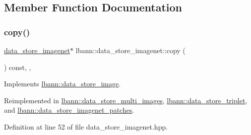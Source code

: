 \subsection{Member Function Documentation}
\mbox{\label{classlbann_1_1data__store__imagenet_ae3b0d31ac020c36f41766999288e2d25}} 
\subsubsection{\texorpdfstring{copy()}{copy()}}
{\footnotesize\ttfamily \hyperlink{classlbann_1_1data__store__imagenet}{data\+\_\+store\+\_\+imagenet}$\ast$ lbann\+::data\+\_\+store\+\_\+imagenet\+::copy (\begin{DoxyParamCaption}{ }\end{DoxyParamCaption}) const\hspace{0.3cm}{\ttfamily [inline]}, {\ttfamily [override]}, {\ttfamily [virtual]}}



Implements \hyperlink{classlbann_1_1data__store__image_ab62efcb2dbe3118bf2815fa5d51fee61}{lbann\+::data\+\_\+store\+\_\+image}.



Reimplemented in \hyperlink{classlbann_1_1data__store__multi__images_a1046efda9448bab9b42e9fcdf71e03f1}{lbann\+::data\+\_\+store\+\_\+multi\+\_\+images}, \hyperlink{classlbann_1_1data__store__triplet_a446ee3b1fa3097e51bd0e198de960cd4}{lbann\+::data\+\_\+store\+\_\+triplet}, and \hyperlink{classlbann_1_1data__store__imagenet__patches_a5067e8299f5cf073497a5005ee9db759}{lbann\+::data\+\_\+store\+\_\+imagenet\+\_\+patches}.



Definition at line 52 of file data\+\_\+store\+\_\+imagenet.\+hpp.


